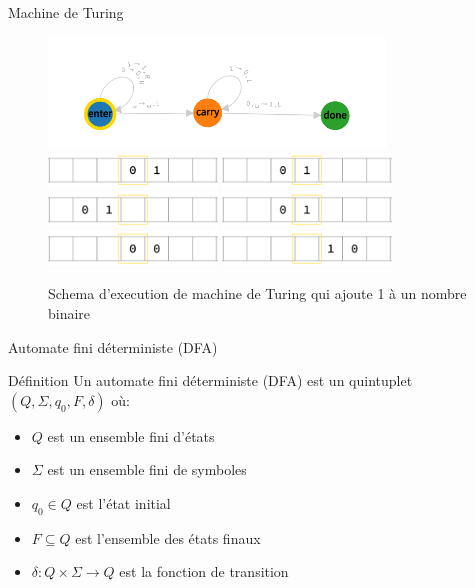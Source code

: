 \documentclass{beamer}
\begin{document}
    \begin{frame}{Machine de Turing}
        \begin{figure}[t]
            \includegraphics[width=0.8\textwidth]{images/MT.png}
            \includegraphics[width=0.4\textwidth]{images/bande1.png}
            \includegraphics[width=0.4\textwidth]{images/bande2.png}
            \includegraphics[width=0.4\textwidth]{images/bande3.png}
            \includegraphics[width=0.4\textwidth]{images/bande4.png}
            \includegraphics[width=0.4\textwidth]{images/bande5.png}
            \includegraphics[width=0.4\textwidth]{images/bande6.png}
            \caption{Schema d'execution de machine de Turing qui ajoute 1 à un 
            nombre binaire}
        \end{figure}
    \end{frame}
    \begin{frame}{Automate fini déterministe (DFA)}
        \begin{alert}{Définition}
            Un automate fini déterministe (DFA) est un quintuplet 
            $(Q, \Sigma, q_0, F, \delta)$ où:
            \begin{itemize}
                \item $Q$ est un ensemble fini d'états
                \item $\Sigma$ est un ensemble fini de symboles
                \item $q_0 \in Q$ est l'état initial
                \item $F \subseteq Q$ est l'ensemble des états finaux
                \item $\delta: Q \times \Sigma \rightarrow Q$ est la 
                fonction de transition
            \end{itemize}
        \end{alert}
    \end{frame}
\end{document}
